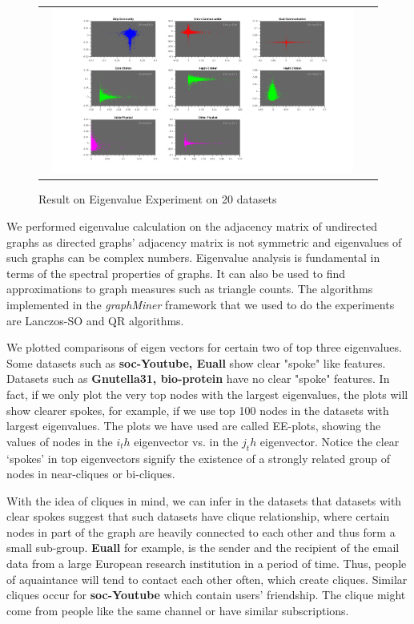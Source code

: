 \begin{figure}[H]
\begin{center}
\begin{tabular}{cc}
     \includegraphics[width=0.95\textwidth]{FIG/eigenv2.png}
\end{tabular}
\caption{Result on Eigenvalue Experiment on 20 datasets}
\end{center}
\end{figure}

We performed eigenvalue calculation on the adjacency matrix of undirected graphs as directed graphs' adjacency matrix is not symmetric and eigenvalues of such graphs can be complex numbers. Eigenvalue analysis is fundamental in terms of the spectral properties of graphs. It can also be used to find approximations to graph measures such as triangle counts.  The algorithms implemented in the {\em graphMiner} framework that we used to do the experiments are Lanczos-SO and QR algorithms.

We plotted comparisons of eigen vectors for certain two of top three eigenvalues. Some datasets such as \textbf{soc-Youtube, Euall} show clear "spoke" like features. Datasets such as \textbf{Gnutella31, bio-protein} have no clear "spoke" features. In fact, if we only plot the very top nodes with the largest eigenvalues, the plots will show clearer spokes, for example, if we use top 100 nodes in the datasets with largest eigenvalues. The plots we have used are called EE-plots, showing the values of nodes in the $i_th$ eigenvector vs. in the $j_th$ eigenvector. Notice the clear ‘spokes’ in top eigenvectors signify the existence of a strongly related group of nodes in near-cliques or bi-cliques. 

With the idea of cliques in mind, we can infer in the datasets that datasets with clear spokes suggest that such datasets have clique relationship, where certain nodes in part of the graph are heavily connected to each other and thus form a small sub-group. \textbf{Euall} for example, is the sender and the recipient of the email data from a large European research institution in a period of time. Thus, people of aquaintance will tend to contact each other often, which create cliques.
Similar cliques occur for \textbf{soc-Youtube} which contain users' friendship. The clique might come from people like the same channel or have similar subscriptions.

